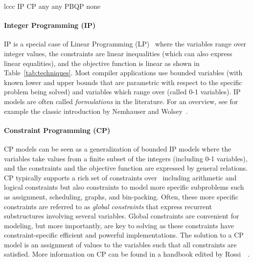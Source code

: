 \documentclass[acmsmall,authorversion,nonacm]{acmart}
\begin{document}
\begin{table}[b]\setlength{\tabcolsep}{0.2cm}
  \setlength{\tabulinesep}{0.1cm}
  \caption{Modeling elements for different techniques.\label{tab:techniques}}
    \begin{tabu}{lccc}\hline
      \rowfont{\bfseries}
      \hline
      \technique
          {IP}
          {}
          {}
          {}
      \technique
          {CP}
          {}
          {any }
          {any }
      \technique
          {PBQP}
          {}
          {\mbox{none}}
          {}
  \end{tabu}\end{table}

\paragraph{Integer Programming (IP)}

IP is a special case of Linear Programming (LP)~\cite{Vanderbei2013}
where the variables range over integer values, the constraints are
linear inequalities (which can also express linear equalities), and
the objective function is linear as shown in
Table~\ref{tab:techniques}.
Most compiler applications use bounded variables (with known lower and
upper bounds that are parametric with respect to the specific problem
being solved) and variables which range over  (called
\mbox{0-1} variables).
IP models are often called \emph{formulations} in the literature.
For an overview, see for example the classic introduction by Nemhauser
and Wolsey~\cite{Nemhauser1999}.

\paragraph{Constraint Programming (CP)}

CP models can be seen as a generalization of bounded IP models where
the variables take values from a finite subset
 of the integers (including 0-1
variables), and the constraints and the objective function are
expressed by general relations.
CP typically supports a rich set of constraints
over~ including arithmetic and logical
constraints but also constraints to model more specific subproblems
such as assignment, scheduling, graphs, and bin-packing.  Often, these
more specific constraints are referred to as \emph{global constraints}
that express recurrent substructures involving several
variables. Global constraints are convenient for modeling, but more
importantly, are key to solving as these constraints have
constraint-specific efficient and powerful implementations.
The solution to a CP model is an assignment of values to the variables
such that all constraints are satisfied.
More information on CP can be found in a handbook edited by
Rossi~\etal{}~\cite{CPH:2006}.
\end{document}

